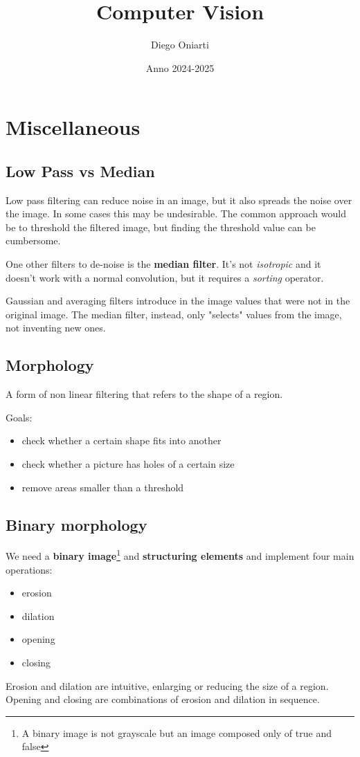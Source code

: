 \documentclass{article}
\title{Computer Vision}
\author{Diego Oniarti}
\date{Anno 2024-2025}
\begin{document}
\maketitle
\tableofcontents

\newpage

\section{Miscellaneous}
\subsection{Low Pass vs Median}
Low pass filtering can reduce noise in an image, but it also spreads the noise over the image. In some cases this may be undesirable. The common approach would be to threshold the filtered image, but finding the threshold value can be cumbersome.

One other filters to de-noise is the \textbf{median filter}. It's not \textit{isotropic} and it doesn't work with a normal convolution, but it requires a \textit{sorting} operator.

Gaussian and averaging filters introduce in the image values that were not in the original image. The median filter, instead, only "selects" values from the image, not inventing new ones.

\subsection{Morphology}
A form of non linear filtering that refers to the shape of a region.

Goals:
\begin{itemize}
    \item check whether a certain shape fits into another
    \item check whether a picture has holes of a certain size
    \item remove areas smaller than a threshold
\end{itemize}

\subsection*{Binary morphology}
We need a \textbf{binary image}\footnote{A binary image is not grayscale but an image composed only of true and false} and \textbf{structuring elements} and implement four main operations:
\begin{itemize}
    \item erosion
    \item dilation
    \item opening
    \item closing
\end{itemize}
Erosion and dilation are intuitive, enlarging or reducing the size of a region. Opening and closing are combinations of erosion and dilation in sequence.
\end{document}
